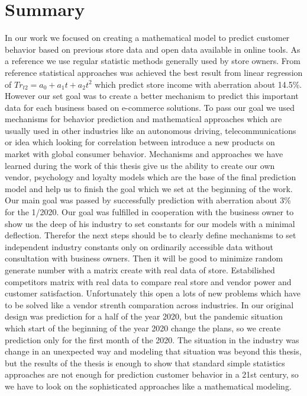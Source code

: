 
\chapter{Summary} \label{summary}
In our work we focused on creating a mathematical model to predict customer behavior based on previous store data and open data available in online tools.
As a reference we use regular statistic methods generally used by store owners.
From reference statistical approaches was achieved the best result from linear regression of $Tr_{t2}=a_0+a_1t+a_2t^2$ which predict store income with aberration about 14.5\%.
However our set goal was to create a better mechanism to predict this important data for each business based on e-commerce solutions.
To pass our goal we used mechanisms for behavior prediction and mathematical approaches which are usually used in other industries like an autonomous driving,
telecommunications or idea which looking for correlation between introduce a new products on market with global consumer behavior.
Mechanisms and approaches we have learned during the work of this thesis give us the ability to create our own vendor, psychology and loyalty models which are the
base of the final prediction model and help us to finish the goal which we set at the beginning of the work.
Our main goal was passed by successfully prediction with aberration about 3\% for the 1/2020.
Our goal was fulfilled in cooperation with the business owner to show us the deep of his industry to set constants for our models with a minimal deflection.
Therefor the next steps should be to clearly define mechanisms to set independent industry constants only on ordinarily accessible data without consultation with business owners.
Then it will be good to minimize random generate number with a matrix create with real data of store. Estabilished competitors matrix with real data to compare real store and vendor power and customer satisfaction. Unfortunately this open a lots of new problems which have to be solved like a vendor strenth comparation across industries.
In our original design was prediction for a half of the year 2020, but the pandemic situation which start of the beginning of the year 2020 change the plans,
so we create prediction only for the first month of the 2020.
The situation in the industry was change in an unexpected way and modeling that situation was beyond this thesis, but the results of the thesis is enough to show that standard
simple statistics approaches are not enough for prediction customer behavior in a 21st century, so we have to look on the sophisticated approaches like a mathematical modeling.
